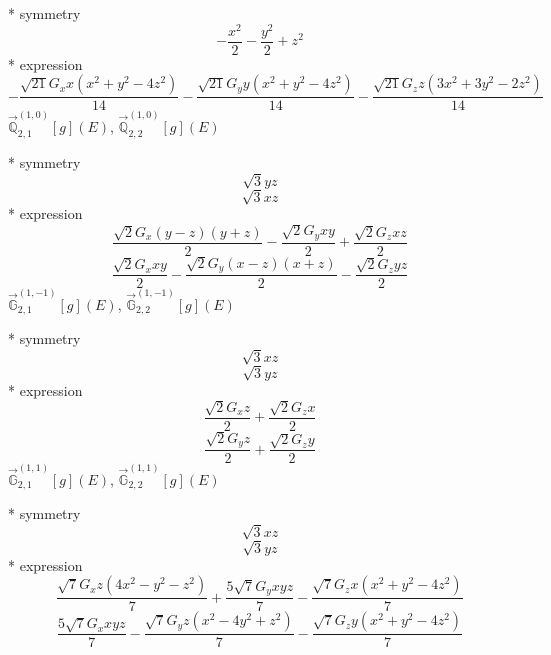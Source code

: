 \documentclass[fleqn,8pt]{jsarticle}
\begin{document}
\noindent\quad ** symmetry
\begin{dmath*}
- \frac{x^{2}}{2} - \frac{y^{2}}{2} + z^{2}
\end{dmath*}
\noindent\quad ** expression
\begin{dmath*}
- \frac{\sqrt{21} G_{x} x \left(x^{2} + y^{2} - 4 z^{2}\right)}{14} - \frac{\sqrt{21} G_{y} y \left(x^{2} + y^{2} - 4 z^{2}\right)}{14} - \frac{\sqrt{21} G_{z} z \left(3 x^{2} + 3 y^{2} - 2 z^{2}\right)}{14}
\end{dmath*}
\noindent\quad $\vec{\mathbb{Q}}_{2,1}^{(1,0)}[g](E)$, $\vec{\mathbb{Q}}_{2,2}^{(1,0)}[g](E)$

\noindent\quad ** symmetry
\begin{dmath*}
\sqrt{3} y z
\end{dmath*}
\begin{dmath*}
\sqrt{3} x z
\end{dmath*}
\noindent\quad ** expression
\begin{dmath*}
\frac{\sqrt{2} G_{x} \left(y - z\right) \left(y + z\right)}{2} - \frac{\sqrt{2} G_{y} x y}{2} + \frac{\sqrt{2} G_{z} x z}{2}
\end{dmath*}
\begin{dmath*}
\frac{\sqrt{2} G_{x} x y}{2} - \frac{\sqrt{2} G_{y} \left(x - z\right) \left(x + z\right)}{2} - \frac{\sqrt{2} G_{z} y z}{2}
\end{dmath*}
\noindent\quad $\vec{\mathbb{G}}_{2,1}^{(1,-1)}[g](E)$, $\vec{\mathbb{G}}_{2,2}^{(1,-1)}[g](E)$

\noindent\quad ** symmetry
\begin{dmath*}
\sqrt{3} x z
\end{dmath*}
\begin{dmath*}
\sqrt{3} y z
\end{dmath*}
\noindent\quad ** expression
\begin{dmath*}
\frac{\sqrt{2} G_{x} z}{2} + \frac{\sqrt{2} G_{z} x}{2}
\end{dmath*}
\begin{dmath*}
\frac{\sqrt{2} G_{y} z}{2} + \frac{\sqrt{2} G_{z} y}{2}
\end{dmath*}
\noindent\quad $\vec{\mathbb{G}}_{2,1}^{(1,1)}[g](E)$, $\vec{\mathbb{G}}_{2,2}^{(1,1)}[g](E)$

\noindent\quad ** symmetry
\begin{dmath*}
\sqrt{3} x z
\end{dmath*}
\begin{dmath*}
\sqrt{3} y z
\end{dmath*}
\noindent\quad ** expression
\begin{dmath*}
\frac{\sqrt{7} G_{x} z \left(4 x^{2} - y^{2} - z^{2}\right)}{7} + \frac{5 \sqrt{7} G_{y} x y z}{7} - \frac{\sqrt{7} G_{z} x \left(x^{2} + y^{2} - 4 z^{2}\right)}{7}
\end{dmath*}
\begin{dmath*}
\frac{5 \sqrt{7} G_{x} x y z}{7} - \frac{\sqrt{7} G_{y} z \left(x^{2} - 4 y^{2} + z^{2}\right)}{7} - \frac{\sqrt{7} G_{z} y \left(x^{2} + y^{2} - 4 z^{2}\right)}{7}
\end{dmath*}
\end{document}
